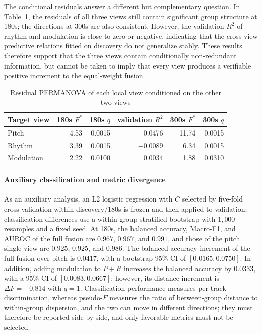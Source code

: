 \documentclass{article}
\begin{document}
The conditional residuals answer a different but complementary question. In Table~\ref{tab:local_fusion_residual}, the residuals of all three views still contain significant group structure at 180s; the directions at 300s are also consistent. However, the validation $R^2$ of rhythm and modulation is close to zero or negative, indicating that the cross-view predictive relations fitted on discovery do not generalize stably. These results therefore support that the three views contain conditionally non-redundant information, but cannot be taken to imply that every view produces a verifiable positive increment to the equal-weight fusion.

\begin{table}[htbp]
\centering
\caption{Residual PERMANOVA of each local view conditioned on the other two views}
\label{tab:local_fusion_residual}
\renewcommand{\arraystretch}{1.5}
\setlength{\tabcolsep}{12pt}
\begin{tabular}{lrrrrr}
\toprule
Target view & 180s $F^{*}$ & 180s $q$ & validation $R^2$ & 300s $F^{*}$ & 300s $q$ \\
\midrule
Pitch & 4.53 & 0.0015 & 0.0476 & 11.74 & 0.0015 \\
Rhythm & 3.39 & 0.0015 & $-0.0089$ & 6.34 & 0.0015 \\
Modulation & 2.22 & 0.0100 & 0.0034 & 1.88 & 0.0310 \\
\bottomrule
\end{tabular}
\end{table}

\paragraph{Auxiliary classification and metric divergence}
As an auxiliary analysis, an L2 logistic regression with $C$ selected by five-fold cross-validation within discovery/180s is frozen and then applied to validation; classification differences use a within-group stratified bootstrap with $1{,}000$ resamples and a fixed seed. At 180s, the balanced accuracy, Macro-F1, and AUROC of the full fusion are $0.967$, $0.967$, and $0.991$, and those of the pitch single view are $0.925$, $0.925$, and $0.986$. The balanced accuracy increment of the full fusion over pitch is $0.0417$, with a bootstrap 95\% CI of $[0.0165,0.0750]$. In addition, adding modulation to $P+R$ increases the balanced accuracy by $0.0333$, with a 95\% CI of $[0.0083,0.0667]$; however, its distance increment is $\Delta F=-0.814$ with $q=1$. Classification performance measures per-track discrimination, whereas pseudo-$F$ measures the ratio of between-group distance to within-group dispersion, and the two can move in different directions; they must therefore be reported side by side, and only favorable metrics must not be selected.
\end{document}
